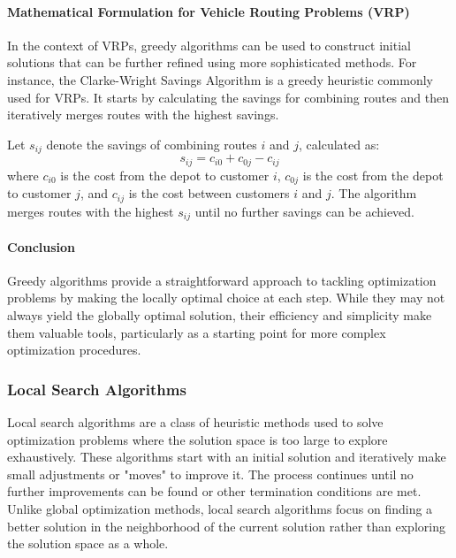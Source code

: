\documentclass[
]{article}
\begin{document}
    \paragraph{Mathematical Formulation for Vehicle Routing Problems (VRP)}

    In the context of VRPs, greedy algorithms can be used to construct initial solutions that can be further refined using more sophisticated methods. For instance, the Clarke-Wright Savings Algorithm is a greedy heuristic commonly used for VRPs. It starts by calculating the savings for combining routes and then iteratively merges routes with the highest savings.

    Let \(s_{ij}\) denote the savings of combining routes \(i\) and \(j\), calculated as:
    \[
        s_{ij} = c_{i0} + c_{0j} - c_{ij}
    \]
    where \(c_{i0}\) is the cost from the depot to customer \(i\), \(c_{0j}\) is the cost from the depot to customer \(j\), and \(c_{ij}\) is the cost between customers \(i\) and \(j\). The algorithm merges routes with the highest \(s_{ij}\) until no further savings can be achieved.

    \paragraph{Conclusion}

    Greedy algorithms provide a straightforward approach to tackling optimization problems by making the locally optimal choice at each step. While they may not always yield the globally optimal solution, their efficiency and simplicity make them valuable tools, particularly as a starting point for more complex optimization procedures.


    \hypertarget{local-search-algorithms}{%

        \subsubsection{Local Search Algorithms}\label{local-search-algorithms}}

    Local search algorithms are a class of heuristic methods used to solve optimization problems where the solution space is too large to explore exhaustively. These algorithms start with an initial solution and iteratively make small adjustments or "moves" to improve it. The process continues until no further improvements can be found or other termination conditions are met. Unlike global optimization methods, local search algorithms focus on finding a better solution in the neighborhood of the current solution rather than exploring the solution space as a whole.
\end{document}
